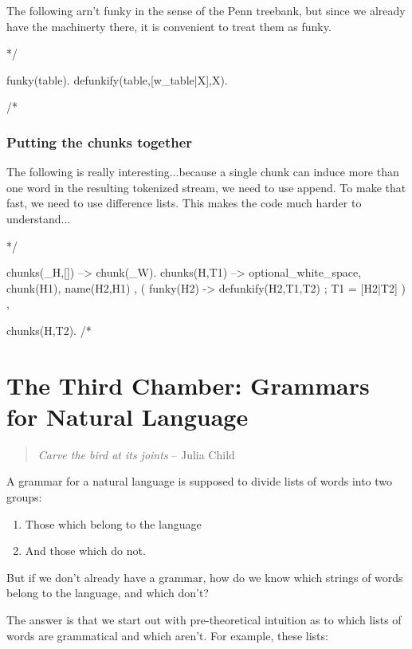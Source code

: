 \documentclass{book}[9pt]
\newenvironment{code}%
{\small \verbatim}%
{\endverbatim \large}
\begin{document}
The following arn't funky in the sense of the Penn treebank, but since we
already have the machinerty there, it is convenient to treat them as funky.

\begin{code}
*/

funky(table).
defunkify(table,[w_table|X],X).

/*
\end{code}

\subsection{Putting the chunks together}

The following is really interesting...because a single chunk can
induce more than one word in the resulting tokenized stream, we need
to use append.  To make that fast, we need to use difference lists.
This makes the code much harder to understand...

\begin{code}
*/

chunks(_H,[]) --> \+ chunk(_W).
chunks(H,T1) -->
        optional_white_space,
        chunk(H1),
        { name(H2,H1) },
        { ( funky(H2) ->
              defunkify(H2,T1,T2)
          ;
              T1 = [H2|T2]
          )
        },
        
        chunks(H,T2).
/*
\end{code}

\chapter{The Third Chamber: Grammars for Natural Language}

\begin{quote}
{\em Carve the bird at its joints} -- Julia Child
\end{quote}

A grammar for a natural language is supposed to divide lists of words
into two groups: 
\begin{enumerate}
\item Those which belong to the language
\item And those which do not.  
\end{enumerate}
\noindent But if we don't already have a grammar, how do we know which
strings of words belong to the language, and which don't?

The answer is that we start out with pre-theoretical intuition as to
which lists of words are grammatical and which aren't.  For
example, these lists:
\end{document}
